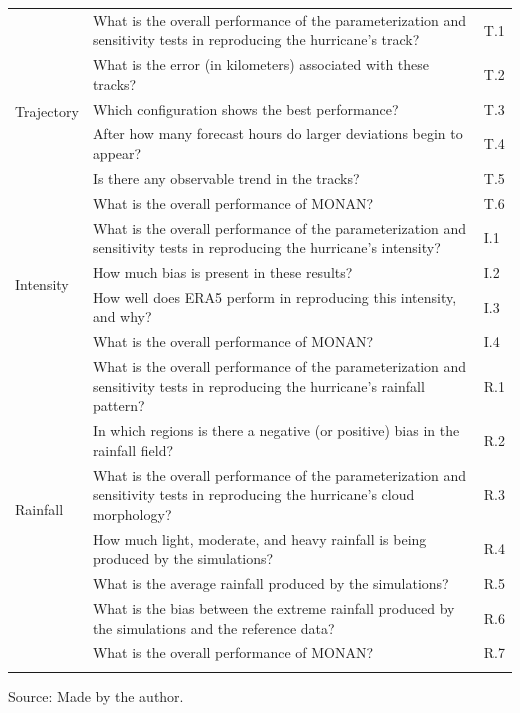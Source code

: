 \begin{longtable}{lp{11cm}l}
	\multirow{6}{*}{Trajectory} 
	& What is the overall performance of the parameterization and sensitivity tests in reproducing the hurricane's track? & T.1 \\
	& What is the error (in kilometers) associated with these tracks? & T.2 \\
	& Which configuration shows the best performance? & T.3 \\
	& After how many forecast hours do larger deviations begin to appear? & T.4 \\
	& Is there any observable trend in the tracks? & T.5 \\
	& What is the overall performance of MONAN? & T.6 \\
	\midrule
	\multirow{4}{*}{Intensity} 
	& What is the overall performance of the parameterization and sensitivity tests in reproducing the hurricane's intensity? & I.1 \\
	& How much bias is present in these results? & I.2 \\
	& How well does ERA5 perform in reproducing this intensity, and why? & I.3 \\
	& What is the overall performance of MONAN? & I.4 \\
	\midrule
	\multirow{7}{*}{Rainfall} 
	& What is the overall performance of the parameterization and sensitivity tests in reproducing the hurricane’s rainfall pattern? & R.1 \\
	& In which regions is there a negative (or positive) bias in the rainfall field? & R.2 \\
	& What is the overall performance of the parameterization and sensitivity tests in reproducing the hurricane’s cloud morphology? & R.3 \\
	& How much light, moderate, and heavy rainfall is being produced by the simulations? & R.4 \\
	& What is the average rainfall produced by the simulations? & R.5 \\
	& What is the bias between the extreme rainfall produced by the simulations and the reference data? & R.6 \\
	& What is the overall performance of MONAN? & R.7 \\
	
	\label{tab:questionsberyl}
\end{longtable}


\vspace{2mm}
{\centering Source: Made by the author.\par}



